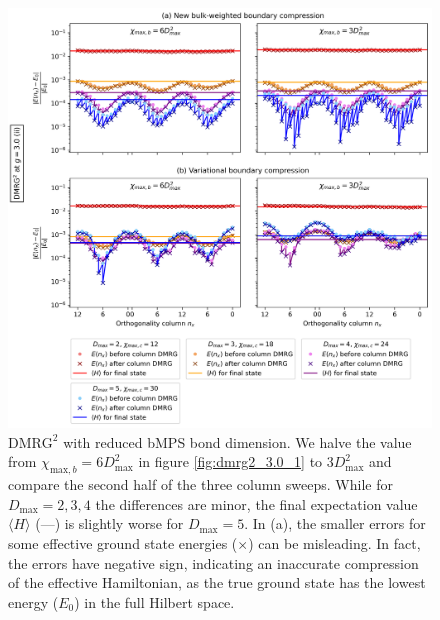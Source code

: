 \newpage
\vspace*{\fill}
\begin{figure}[H]
  \centering
  \includegraphics[width=1.0\linewidth]{dmrg_6_6_3.0_2.png}
  \caption{$\text{DMRG}^2$ with reduced bMPS bond dimension. We halve the value from $\chi_{\text{max}, b} = 6D_{\text{max}}^2$ in figure \ref{fig:dmrg2_3.0_1} to $3D_{\text{max}}^2$ and compare the second half of the three column sweeps. While for $D_{\text{max}} = 2, 3, 4$ the differences are minor, the final expectation value $\langle H \rangle$ (---) is slightly worse for $D_{\text{max}} = 5$. In (a), the smaller errors for some effective ground state energies ($\times$) can be misleading. In fact, the errors have negative sign, indicating an inaccurate compression of the effective Hamiltonian, as the true ground state has the lowest energy ($E_0$) in the full Hilbert space.}
\label{fig:dmrg2_3.0_2}
\end{figure}
\vspace*{\fill}

\newpage
